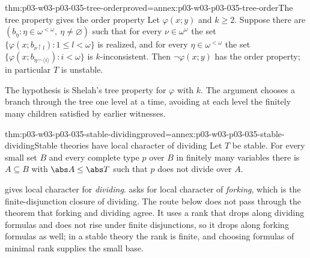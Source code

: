 \begin{hblemma}{thm:p03-w03-p03-035-tree-order}{proved=annex:p03-w03-p03-035-tree-order}{The tree property gives the order property}
Let \(\varphi(x;y)\) and \(k\geq2\).  Suppose there are
\((b_\eta:\eta\in\omega^{<\omega},\ \eta\neq\varnothing)\) such that for every
\(\nu\in\omega^\omega\) the set \(\{\varphi(x;b_{\nu\restriction l}):1\leq
l<\omega\}\) is realized, and for every \(\eta\in\omega^{<\omega}\) the set
\(\{\varphi(x;b_{\eta\frown\langle i\rangle}):i<\omega\}\) is
\(k\)-inconsistent.  Then \(\neg\varphi(x;y)\) has the order property; in
particular \(T\) is unstable.
\end{hblemma}

The hypothesis is Shelah's tree property for \(\varphi\) with \(k\).  The
argument chooses a branch through the tree one level at a time, avoiding
at each level the finitely many children satisfied by earlier witnesses.

\begin{hbtheorem}{thm:p03-w03-p03-035-stable-dividing}{proved=annex:p03-w03-p03-035-stable-dividing}{Stable theories have local character of dividing}
Let \(T\) be stable.  For every small set \(B\) and every complete type
\(p\) over \(B\) in finitely many variables there is \(A\subseteq B\) with
\(\abs A\leq\abs T\) such that \(p\) does not divide over \(A\).
\end{hbtheorem}

 gives local character for
\emph{dividing}.   asks for local character of
\emph{forking}, which is the finite-disjunction closure of dividing.  The
route below does not pass through the theorem that forking and dividing
agree.  It uses a rank that drops along dividing formulas and does not rise
under finite disjunctions, so it drops along forking formulas as well; in a
stable theory the rank is finite, and choosing formulas of minimal rank
supplies the small base.

